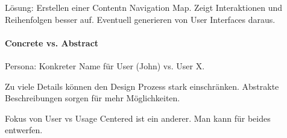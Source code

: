 Lösung: Erstellen einer Contentn Navigation Map. Zeigt Interaktionen und Reihenfolgen
besser auf. Eventuell generieren von User Interfaces daraus.


\paragraph{Concrete vs. Abstract}
Persona: Konkreter Name für User (John) vs. User X. 

Zu viele Details können den Design Prozess stark einschränken. 
Abstrakte Beschreibungen sorgen für mehr Möglichkeiten.

Fokus von User vs Usage Centered ist ein anderer. Man kann für beides entwerfen.
